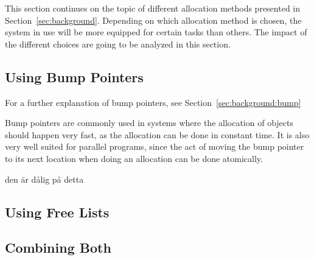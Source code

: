 

This section continues on the topic of different allocation methods presented in Section~\ref{sec:background}. Depending on which allocation method is chosen, the system in use will be more equipped for certain tasks than others. The impact of the different choices are going to be analyzed in this section.

\subsection{Using Bump Pointers}
For a further explanation of bump pointers, see Section~\ref{sec:background:bump}

Bump pointers are commonly used in systems where the allocation of objects should happen very fast, as the allocation can be done in constant time. It is also very well suited for parallel programs, since the act of moving the bump pointer to its next location when doing an allocation can be done atomically.



den är dålig på detta

\subsection{Using Free Lists}
\subsection{Combining Both}

